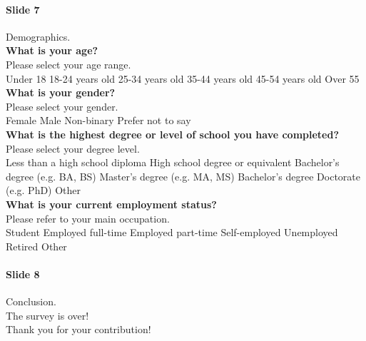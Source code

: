 \paragraph{Slide 7} Demographics.\\
\textbf{What is your age?}\\
Please select your age range.\\
{\huge \Square} Under 18 {\huge \Square} 18-24 years old {\huge \Square} 25-34 years old {\huge \Square} 35-44 years old {\huge \Square} 45-54 years old {\huge \Square} Over 55\\
\textbf{What is your gender?}\\
Please select your gender.\\
{\huge \Square} Female {\huge \Square} Male {\huge \Square} Non-binary {\huge \Square} Prefer not to say\\
\textbf{What is the highest degree or level of school you have completed?}\\
Please select your degree level.\\
{\huge \Square} Less than a high school diploma {\huge \Square} High school degree or equivalent {\huge \Square} Bachelor’s degree (e.g. BA, BS) {\huge \Square} Master’s degree (e.g. MA, MS) {\huge \Square} Bachelor’s degree Doctorate (e.g. PhD) {\huge \Square} Other\\
\textbf{What is your current employment status?}\\
Please refer to your main occupation.\\
{\huge \Square} Student {\huge \Square} Employed full-time {\huge \Square} Employed part-time {\huge \Square} Self-employed {\huge \Square} Unemployed {\huge \Square} Retired {\huge \Square} Other

\paragraph{Slide 8} Conclusion.\\
The survey is over!\\
Thank you for your contribution!\\
